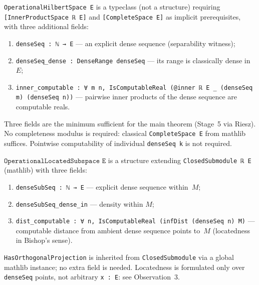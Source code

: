 \begin{definition}
\label{def:OperationalHilbertSpace}
\leanok
{}
\texttt{OperationalHilbertSpace~E} is a typeclass (not a structure)
requiring \texttt{[InnerProductSpace ℝ E]} and \texttt{[CompleteSpace E]}
as implicit prerequisites, with three additional fields:
\begin{enumerate}
\item \texttt{denseSeq : ℕ → E} --- an explicit dense sequence
  (separability witness);
\item \texttt{denseSeq\_dense : DenseRange denseSeq} --- its range is
  classically dense in $E$;
\item \texttt{inner\_computable : ∀ m n, IsComputableReal (@inner ℝ E \_
  (denseSeq m) (denseSeq n))} --- pairwise inner products of the dense
  sequence are computable reals.
\end{enumerate}
Three fields are the minimum sufficient for the main theorem
(Stage~5 via Riesz).  No completeness modulus is required: classical
\texttt{CompleteSpace E} from mathlib suffices.  Pointwise computability
of individual \texttt{denseSeq k} is not required.
\end{definition}

\begin{definition}
\label{def:OperationalLocatedSubspace}
\leanok
{}
$\texttt{OperationalLocatedSubspace E}$ is a structure extending
\texttt{ClosedSubmodule ℝ E} (mathlib) with three fields:
\begin{enumerate}
\item \texttt{denseSubSeq : ℕ → E} --- explicit dense sequence within~$M$;
\item \texttt{denseSubSeq\_dense\_in} --- density within $M$;
\item \texttt{dist\_computable : ∀ n, IsComputableReal (infDist
  (denseSeq n) M)} --- computable distance from ambient dense sequence
  points to~$M$ (locatedness in Bishop's sense).
\end{enumerate}
\texttt{HasOrthogonalProjection} is inherited from
\texttt{ClosedSubmodule} via a global mathlib instance; no extra field
is needed.  Locatedness is formulated only over \texttt{denseSeq}
points, not arbitrary \texttt{x : E}: see Observation~3.
\end{definition}

